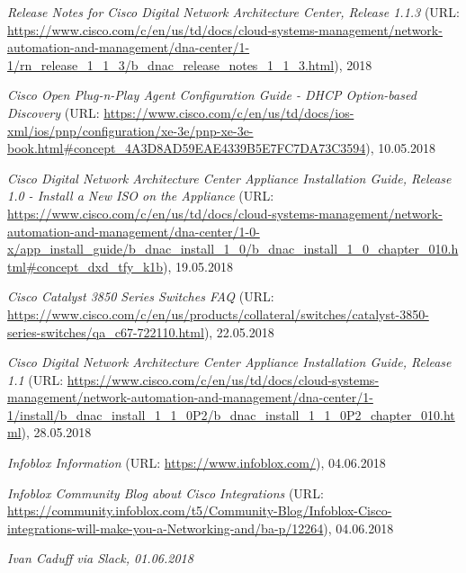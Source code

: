 \begin{thebibliography}{}
	 \textit{Release Notes for Cisco Digital Network Architecture Center, Release 1.1.3} (URL: \url{https://www.cisco.com/c/en/us/td/docs/cloud-systems-management/network-automation-and-management/dna-center/1-1/rn_release_1_1_3/b_dnac_release_notes_1_1_3.html}), 2018
	
	 \textit{Cisco Open Plug-n-Play Agent Configuration Guide - DHCP Option-based Discovery} (URL: \url{https://www.cisco.com/c/en/us/td/docs/ios-xml/ios/pnp/configuration/xe-3e/pnp-xe-3e-book.html#concept_4A3D8AD59EAE4339B5E7FC7DA73C3594}), 10.05.2018
	
	 \textit{Cisco Digital Network Architecture Center Appliance Installation Guide, Release 1.0 - Install a New ISO on the Appliance
	} (URL: \url{https://www.cisco.com/c/en/us/td/docs/cloud-systems-management/network-automation-and-management/dna-center/1-0-x/app_install_guide/b_dnac_install_1_0/b_dnac_install_1_0_chapter_010.html#concept_dxd_tfy_k1b}), 19.05.2018

	 \textit{Cisco Catalyst 3850 Series Switches FAQ} (URL: \url{https://www.cisco.com/c/en/us/products/collateral/switches/catalyst-3850-series-switches/qa_c67-722110.html}), 22.05.2018	

	 \textit{Cisco Digital Network Architecture Center Appliance Installation Guide, Release 1.1} (URL: \url{https://www.cisco.com/c/en/us/td/docs/cloud-systems-management/network-automation-and-management/dna-center/1-1/install/b_dnac_install_1_1_0P2/b_dnac_install_1_1_0P2_chapter_010.html}), 28.05.2018
	
	 \textit{Infoblox Information} (URL: \url{https://www.infoblox.com/}), 04.06.2018
	
	 \textit{Infoblox Community Blog about Cisco Integrations} (URL: \url{https://community.infoblox.com/t5/Community-Blog/Infoblox-Cisco-integrations-will-make-you-a-Networking-and/ba-p/12264}), 04.06.2018
	
	 \textit{Ivan Caduff via Slack, 01.06.2018}
	
\end{thebibliography}
